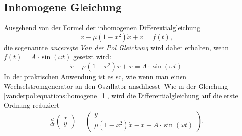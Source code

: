 \subsection{Inhomogene Gleichung}
\label{vanderpol:subsection:inhomogene}
Ausgehend von der Formel der inhomogenen Differentialgleichung
\begin{equation*}
	\ddot{x}-\mu(1-x^{2}) \dot{x}+x = f(t),
\label{vanderpol:equations:inhomogene_gen}
\end{equation*}
die sogenannte {\em angeregte Van der Pol Gleichung} wird daher erhalten, wenn $f(t) = A \cdot \sin(\omega t)$ gesetzt wird:
%
%
\begin{equation}
	\ddot{x}-\mu(1-x^{2}) \dot{x}+x = A \cdot \sin(\omega t).
\label{vanderpol:equations:inhomogene_sin}
\end{equation}
In der praktischen Anwendung ist es so, wie wenn man einen Wechselstromgenerator an den Oszillator anschliesst. Wie in der Gleichung \eqref{vanderpol:equations:homogene_1}, wird die Differentialgleichung auf die erste Ordnung reduziert:
\begin{align}
\frac{d}{dt}\begin{pmatrix}x \\ y\end{pmatrix} = \begin{pmatrix}y \\ \mu (1-x^{2})\dot{x}-x+A \cdot \sin(\omega t)\end{pmatrix}.
\label{vanderpol:equations:inhomogene_2}
\end{align}

